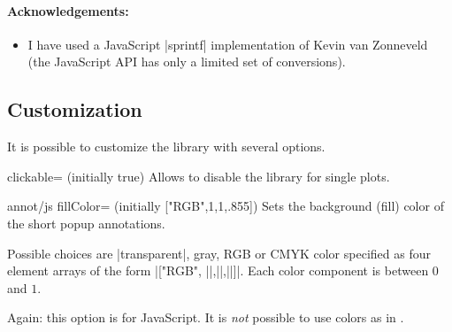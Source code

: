 \paragraph{Acknowledgements:}

\begin{itemize}
    \item I have used a JavaScript |sprintf| implementation of Kevin van
        Zonneveld~\cite{phptojs} (the JavaScript API has only a limited set
        of conversions).
\end{itemize}


\subsection{Customization}

It is possible to customize the library with several options.

\begin{pgfplotskey}{clickable= (initially true)}
    Allows to disable the library for single plots.
\end{pgfplotskey}

\begin{pgfplotskey}{annot/js fillColor= (initially ["RGB",1,1,.855])}
    Sets the background (fill) color of the short popup annotations.

    Possible choices are |transparent|, gray, RGB or CMYK color specified as
    four element arrays of the form
    |["RGB", ||,||,||]|. Each color component
    is between $0$ and $1$.

    Again: this option is for JavaScript. It is \emph{not} possible to use
    colors as in \pgfname{}.
\end{pgfplotskey}

